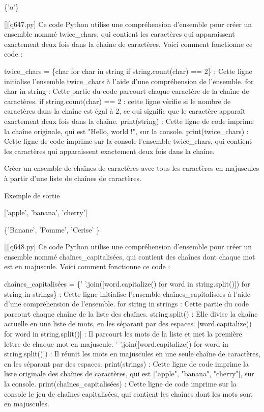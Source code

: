 \{'o'\}
        \par
        \begin{solution}
            \renewcommand{\nomfichier}{q647.py}
            \pythonfile{\chemincode \nomfichier}[][\nomfichier]
            Ce code Python utilise une compréhension d'ensemble pour créer un ensemble nommé twice\_chars, qui contient les caractères qui apparaissent exactement deux fois dans la chaîne de caractères. Voici comment fonctionne ce code :

    twice\_chars = \{char for char in string if string.count(char) == 2\} : Cette ligne initialise l'ensemble twice\_chars à l'aide d'une compréhension de l'ensemble.
        for char in string : Cette partie du code parcourt chaque caractère de la chaîne de caractères.
        if string.count(char) == 2 : cette ligne vérifie si le nombre de caractères dans la chaîne est égal à 2, ce qui signifie que le caractère apparaît exactement deux fois dans la chaîne.
    print(string) : Cette ligne de code imprime la chaîne originale, qui est "Hello, world !", sur la console.
    print(twice\_chars) : Cette ligne de code imprime sur la console l'ensemble twice\_chars, qui contient les caractères qui apparaissent exactement deux fois dans la chaîne.
        \end{solution}
        

        \question
        Créer un ensemble de chaînes de caractères avec tous les caractères en majuscules à partir d'une liste de chaînes de caractères.

Exemple de sortie

['apple', 'banana', 'cherry']

\{'Banane', 'Pomme', 'Cerise' \}
        \par
        \begin{solution}
            \renewcommand{\nomfichier}{q648.py}
            \pythonfile{\chemincode \nomfichier}[][\nomfichier]
            Ce code Python utilise une compréhension d'ensemble pour créer un ensemble nommé chaînes\_capitalisées, qui contient des chaînes dont chaque mot est en majuscule. Voici comment fonctionne ce code :

    chaînes\_capitalisées = \{' '.join([word.capitalize() for word in string.split()]) for string in strings\} : Cette ligne initialise l'ensemble chaînes\_capitalisées à l'aide d'une compréhension de l'ensemble.
        for string in strings : Cette partie du code parcourt chaque chaîne de la liste des chaînes.
        string.split() : Elle divise la chaîne actuelle en une liste de mots, en les séparant par des espaces.
        [word.capitalize() for word in string.split()] : Il parcourt les mots de la liste et met la première lettre de chaque mot en majuscule.
        ' '.join([word.capitalize() for word in string.split()]) : Il réunit les mots en majuscules en une seule chaîne de caractères, en les séparant par des espaces.
    print(strings) : Cette ligne de code imprime la liste originale des chaînes de caractères, qui est ["apple", "banana", "cherry"], sur la console.
    print(chaînes\_capitalisées) : Cette ligne de code imprime sur la console le jeu de chaînes capitalisées, qui contient les chaînes dont les mots sont en majuscules.
        \end{solution}
        

